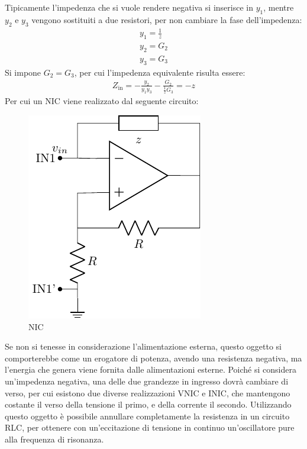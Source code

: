 \documentclass{article}
\numberwithin{equation}{subsection}
\begin{document}
Tipicamente l'impedenza che si vuole rendere negativa si inserisce in $y_1$, mentre $y_2$ e $y_3$ vengono sostituiti a due resistori, per non cambiare 
la fase dell'impedenza:
\begin{gather*}
    y_1=\displaystyle\frac{1}{z}\\
    y_2=G_2\\
    y_3=G_3
\end{gather*}
Si impone $G_2=G_3$, per cui l'impedenza equivalente risulta essere:
\begin{gather*}
    Z_\mathrm{in}=\displaystyle-\frac{y_2}{y_1y_3}-\frac{G_2}{\displaystyle\frac{1}{z}G_3}=-z
\end{gather*}
Per cui un NIC viene realizzato dal seguente circuito:
\begin{figure}[H]%
    \centering
    \includegraphics{amplificatore-nic-resistore.pdf}%
    \caption{NIC}
    \label{fig:amplificatore-nic-resistori}
\end{figure}   

Se non si tenesse in considerazione l'alimentazione esterna, questo oggetto si comporterebbe come un erogatore di potenza, avendo una 
resistenza negativa, ma l'energia che genera viene fornita dalle alimentazioni esterne. 
Poiché si considera un'impedenza negativa, una delle due grandezze in ingresso dovrà cambiare di verso, per cui esistono due diverse realizzazioni 
VNIC e INIC, che mantengono costante il verso della tensione il primo, e della corrente il secondo. 
Utilizzando questo oggetto è possibile annullare completamente la resistenza in un circuito RLC, per ottenere con un'eccitazione di tensione in continuo 
un'oscillatore pure alla frequenza di risonanza. 
\end{document}

